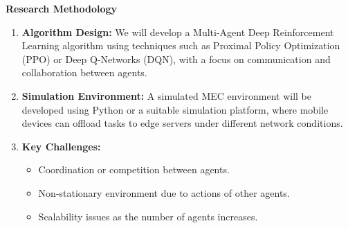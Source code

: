 \documentclass[12pt]{article}
\begin{document}
\vspace{5mm}

\noindent\textbf{\large Research Methodology}
\begin{enumerate} 
	\item \textbf{Algorithm Design:} We will develop a Multi-Agent Deep Reinforcement Learning algorithm using techniques such as Proximal Policy Optimization (PPO) or Deep Q-Networks (DQN), with a focus on communication and collaboration between agents. 
	\item \textbf{Simulation Environment:} A simulated MEC environment will be developed using Python or a suitable simulation platform, where mobile devices can offload tasks to edge servers under different network conditions.
 \item \textbf{Key Challenges:} \begin{itemize} \item Coordination or competition between agents. \item Non-stationary environment due to actions of other agents. \item Scalability issues as the number of agents increases. \end{itemize} 
\end{enumerate}






\end{document}
